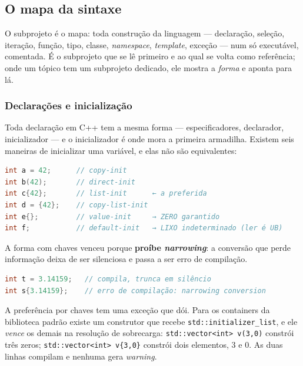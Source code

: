 \subsection{O mapa da sintaxe}
\label{sec:syntax}

O subprojeto  é o mapa: toda construção da linguagem ---
declaração, seleção, iteração, função, tipo, classe, \emph{namespace},
\emph{template}, exceção --- num só executável, comentada. É o subprojeto que se
lê primeiro e ao qual se volta como referência; onde um tópico tem um
subprojeto dedicado, ele mostra a \emph{forma} e aponta para lá.

\subsubsection{Declarações e inicialização}

Toda declaração em C++ tem a mesma forma --- especificadores, declarador,
inicializador --- e o inicializador é onde mora a primeira armadilha. Existem
seis maneiras de inicializar uma variável, e elas não são equivalentes:

\begin{lstlisting}[style=bt, language=C++,
    caption={As seis formas de inicializar, e o que cada uma garante.}]
int a = 42;      // copy-init
int b(42);       // direct-init
int c{42};       // list-init      ← a preferida
int d = {42};    // copy-list-init
int e{};         // value-init     → ZERO garantido
int f;           // default-init   → LIXO indeterminado (ler é UB)
\end{lstlisting}

A forma com chaves venceu porque \textbf{proíbe \emph{narrowing}}: a conversão
que perde informação deixa de ser silenciosa e passa a ser erro de compilação.

\begin{lstlisting}[style=bt, language=C++,
    caption={A diferença de uma chave.}]
int t = 3.14159;   // compila, trunca em silêncio
int s{3.14159};    // erro de compilação: narrowing conversion
\end{lstlisting}

\begin{armadilha}
A preferência por chaves tem uma exceção que dói. Para os containers da
biblioteca padrão existe um construtor que recebe
\texttt{std::initializer\_list}, e ele \emph{vence} os demais na resolução de
sobrecarga:
\texttt{std::vector<int> v(3,0)} constrói três zeros;
\texttt{std::vector<int> v\{3,0\}} constrói dois elementos, 3 e 0. As duas
linhas compilam e nenhuma gera \emph{warning}.
\end{armadilha}

